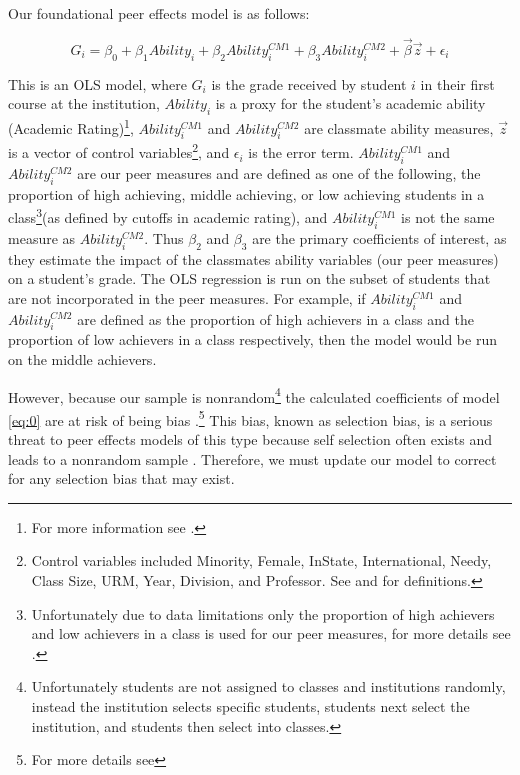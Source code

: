 Our foundational peer effects model is as follows:
\setlength{\belowdisplayskip}{6pt} \setlength{\belowdisplayshortskip}{1pt}
\setlength{\abovedisplayskip}{-4pt} \setlength{\abovedisplayshortskip}{1pt}

\begin{equation}\label{eq:0}
G_{i} = \beta_{0} + \beta_{1} Ability_{i} + \beta_{2} Ability_{i}^{CM1} + \beta_{3} Ability_{i}^{CM2} + \overrightarrow{\beta} \overrightarrow{z} + \epsilon_{i}
\end{equation}

This is an OLS model, where $G_{i}$ is the grade received by student $i$ in their first course at the institution, $Ability_{i}$ is a proxy for the student's academic ability (Academic Rating)\footnote{For more information see .}, $Ability_{i}^{CM1}$ and $Ability_{i}^{CM2}$ are classmate ability measures, $\overrightarrow{z}$ is a vector of control variables\footnote{Control variables included Minority, Female, InState, International, Needy, Class Size, URM, Year, Division, and Professor. See  and  for definitions.}, and $\epsilon_{i}$ is the error term. 
$Ability_{i}^{CM1}$ and $Ability_{i}^{CM2}$ are our peer measures and are defined as one of the following, the proportion of high achieving, middle achieving, or low achieving students in a class\footnote{Unfortunately due to data limitations only the proportion of high achievers and low achievers in a class is used for our peer measures, for more details see .}(as defined by cutoffs in academic rating), and $Ability_{i}^{CM1}$ is not the same measure as  $Ability_{i}^{CM2}$. 
Thus $\beta_{2}$ and $\beta_{3}$ are the primary coefficients of interest, as they estimate the impact of the classmates ability variables (our peer measures) on a student's grade. 
The OLS regression is run on the subset of students that are not incorporated in the peer measures. 
For example, if $Ability_{i}^{CM1}$ and $Ability_{i}^{CM2}$ are defined as the proportion of high achievers in a class and the proportion of low achievers in a class respectively, then the model would be run on the middle achievers. 

However, because our sample is nonrandom\footnote{Unfortunately students are not assigned to classes and institutions randomly, instead the institution selects specific students, students next select the institution, and students then select into classes.} the calculated coefficients of model \eqref{eq:0} are at risk of being bias \citep{heckman1979sample}.\footnote{For more details see } This bias, known as selection bias, is a serious threat to peer effects models of this type because self selection often exists and leads to a nonrandom sample \citep{carman2012classroom,burke2013classroom,ding2007peers}. 
Therefore, we must update our model to correct for any selection bias that may exist.

